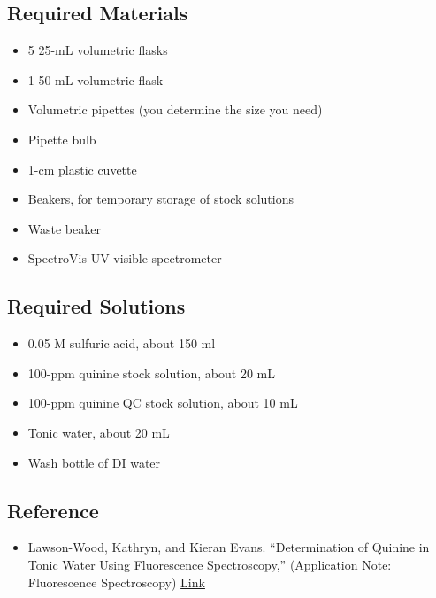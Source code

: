 \documentclass[]{tufte-book}
\providecommand{\tightlist}{%
  \setlength{\itemsep}{0pt}\setlength{\parskip}{0pt}}
\begin{document}
\hypertarget{required-materials}{%
\subsection*{Required Materials}\label{required-materials}}

\begin{itemize}
\tightlist
\item
  5 25-mL volumetric flasks
\item
  1 50-mL volumetric flask
\item
  Volumetric pipettes (you determine the size you need)
\item
  Pipette bulb
\item
  1-cm plastic cuvette
\item
  Beakers, for temporary storage of stock solutions
\item
  Waste beaker
\item
  SpectroVis UV-visible spectrometer
\end{itemize}

\hypertarget{required-solutions}{%
\subsection*{Required Solutions}\label{required-solutions}}

\begin{itemize}
\tightlist
\item
  0.05 M sulfuric acid, about 150 ml
\item
  100-ppm quinine stock solution, about 20 mL
\item
  100-ppm quinine QC stock solution, about 10 mL
\item
  Tonic water, about 20 mL
\item
  Wash bottle of DI water
\end{itemize}

\hypertarget{reference}{%
\subsection*{Reference}\label{reference}}

\begin{itemize}
\tightlist
\item
  Lawson-Wood, Kathryn, and Kieran Evans. ``Determination of Quinine
  in Tonic Water Using Fluorescence Spectroscopy,'' (Application Note: Fluorescence Spectroscopy) \href{https://www.perkinelmer.com/lab-solutions/resources/docs/APP_Quinine_in_Tonic_Water_014133_01.pdf}{Link}
\end{itemize}
\end{document}
